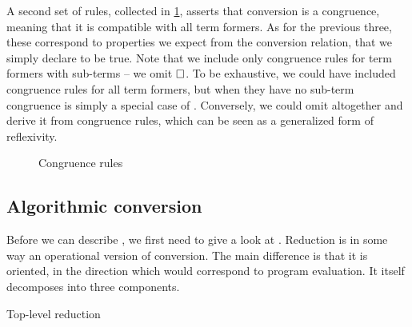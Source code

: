 A second set of rules, collected in \cref{fig:cic-uconv-cong},
asserts that conversion is a congruence, meaning that it is compatible
with all term formers. As for the previous three, these correspond to properties we expect
from the conversion relation, that we simply declare to be true. Note that we include only
congruence rules for term formers with sub-terms – we \eg omit $\uni$. To be exhaustive,
we could have included congruence rules for all term formers, but when they have no
sub-term congruence is simply a special case of .
Conversely, we could omit 
altogether and derive it from congruence rules,
which can be seen as a generalized form of reflexivity.

\begin{figure}[hb]
  \ContinuedFloat
  \caption{Congruence rules}
  \label{fig:cic-uconv-cong}
\end{figure}

\subsection{Algorithmic conversion}

\AP Before we can describe , we first need
to give a look at . Reduction is in some way an operational version of
conversion. The main difference is that it is oriented, in the direction which would
correspond to program evaluation. It itself decomposes into three components.

\begin{marginfigure}
  \ContinuedFloat*
  \begin{mathpar}
    \label{rule:beta-red}
  \end{mathpar}
  \caption{Top-level reduction}
\end{marginfigure}

